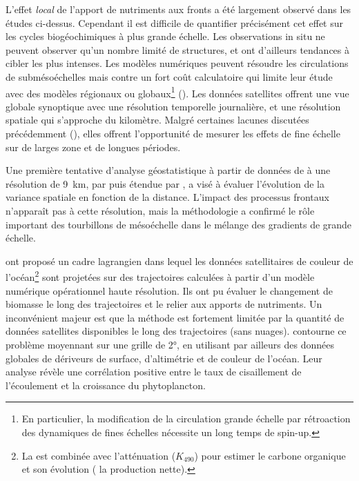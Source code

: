 
L'effet \emph{local} de l'apport de nutriments aux fronts a été largement observé dans les études ci-dessus.
Cependant il est difficile de quantifier précisément cet effet sur les cycles biogéochimiques à plus grande échelle.
Les observations in situ ne peuvent observer qu'un nombre limité de structures, et ont d'ailleurs tendances à cibler les plus intenses.\enlargethispage{-2.2\baselineskip}
Les modèles numériques peuvent résoudre les circulations de submésoéchelles mais contre un fort coût calculatoire qui limite leur étude avec des modèles régionaux ou globaux\footnote{%
  En particulier, la modification de la circulation grande échelle par rétroaction des dynamiques de fines échelles nécessite un long temps de spin-up.
} (\cite{kessouri_2020,hewitt_2022}).
Les données satellites offrent une vue globale synoptique avec une résolution temporelle journalière, et une résolution spatiale qui s'approche du kilomètre.
Malgré certaines lacunes discutées précédemment (), elles offrent l'opportunité de mesurer les effets de fine échelle sur de larges zone et de longues périodes.

Une première tentative d'analyse géostatistique à partir de données de  à une résolution de \qty{9}{\km}, par \textcite{doney_2003} puis étendue par \textcite{glover_2018}, a visé à évaluer l'évolution de la variance spatiale en fonction de la distance.
L'impact des processus frontaux n'apparaît pas à cette résolution, mais la méthodologie a confirmé le rôle important des tourbillons de mésoéchelle dans le mélange des gradients de grande échelle.

\Textcite{jonsson_2011} ont proposé un cadre lagrangien dans lequel les données satellitaires de couleur de l'océan\footnote{%
  La  est combinée avec l'atténuation (\(K_{490}\)) pour estimer le carbone organique et son évolution ( la production nette).
} sont projetées sur des trajectoires calculées à partir d'un modèle numérique opérationnel haute résolution.
Ils ont pu évaluer le changement de biomasse le long des trajectoires et le relier aux apports de nutriments.
Un inconvénient majeur est que la méthode est fortement limitée par la quantité de données satellites disponibles le long des trajectoires (sans nuages).
\Textcite{zhang_2019} contourne ce problème moyennant sur une grille de \ang{2}, en utilisant par ailleurs des données globales de dériveurs de surface, d'altimétrie et de couleur de l'océan.
Leur analyse révèle une corrélation positive entre le taux de cisaillement de l'écoulement et la croissance du phytoplancton.


